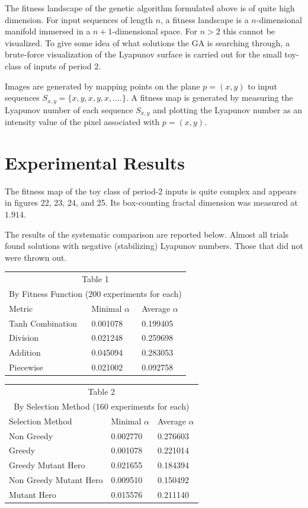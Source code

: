 \documentclass[12pt]{article}
\begin{document}
The fitness landscape of the genetic algorithm formulated above is of quite
high dimension.  For input sequences of length $n$, a fitness landscape is
a $n$-dimensional manifold immersed in a $n+1$-dimensional space.  For $n > 2$
this cannot be visualized.  To give some idea of what solutions the GA is
searching through, a brute-force visualization of the Lyapunov surface is
carried out for the small toy-class of inputs of period 2.

Images are generated by mapping points on the plane $p=(x,y)$ to input
sequences $S_{x,y} = \lbrace x, y, x, y, x, .... \rbrace$.  A fitness map
is generated by measuring the Lyapunov number of each sequence $S_{x,y}$ and
plotting the Lyapunov number as an intensity value of the pixel associated
with $p=(x,y)$.

\section{Experimental Results}
The fitness map of the toy class of period-2 inputs is quite complex and appears in figures 22, 23, 24, and 25.  Its box-counting fractal dimension was measured at $1.914$.

The results of the systematic comparison are reported below.  Almost all
trials found solutions with negative (stabilizing) Lyapunov numbers.  Those
that did not were thrown out.

\vspace{20pt}

\begin{tabular}{|p{5cm}|p{2cm}|p{2cm}|}
\hline
\multicolumn{3}{|c|}{Table 1} \\
\multicolumn{3}{|c|}{By Fitness Function (200 experiments for each)} \\
\hline
Metric & Minimal $\alpha$ & Average $\alpha$ \\
\hline
\hline
Tanh Combination & 0.001078 & 0.199405 \\
\hline
Division  & 0.021248 & 0.259698 \\
\hline
Addition  & 0.045094 & 0.283053 \\
\hline
Piecewise & 0.021002 & 0.092758 \\
\hline
\end{tabular}

\vspace{20pt}

\begin{tabular}{|p{5cm}|p{2.0cm}|p{2.0cm}|}
\hline
\multicolumn{3}{|c|}{Table 2} \\
\multicolumn{3}{|c|}{By Selection Method (160 experiments for each)} \\
\hline
Selection Method & Minimal $\alpha$ & Average $\alpha$ \\
\hline
\hline
Non Greedy & 0.002770 & 0.276603 \\
\hline
Greedy & 0.001078 & 0.221014 \\
\hline
Greedy Mutant Hero & 0.021655 & 0.184394 \\
\hline
Non Greedy Mutant Hero & 0.009510 & 0.150492 \\
\hline
Mutant Hero & 0.015576 & 0.211140 \\
\hline
\end{tabular}
\end{document}
